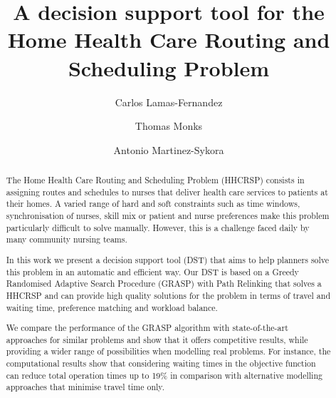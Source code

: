 \documentclass[a4paper,11pt,authoryear]{elsarticle}
\begin{document}
\begin{frontmatter}

\title{A decision support tool for the Home Health Care Routing and Scheduling Problem}

\author[1]{Carlos Lamas-Fernandez}
\address[1]{Southampton Business School, University of Southampton, Southampton SO17 1BJ, UK}

\author[2]{Thomas Monks}
\address[2]{University of Exeter Medical School, University of Exeter, Exeter, UK}
\author[1]{Antonio Martinez-Sykora}

\begin{abstract}
The Home Health Care Routing and Scheduling Problem (HHCRSP) consists in assigning routes and schedules to nurses that deliver health care services to patients at their homes. A varied range of hard and soft constraints such as time windows, synchronisation of nurses, skill mix or patient and nurse preferences make this problem particularly difficult to solve manually. However, this is a challenge faced daily by many community nursing teams.

In this work we present a decision support tool (DST) that aims to help planners solve this problem in an automatic and efficient way. Our DST is based on a Greedy Randomised Adaptive Search Procedure (GRASP) with Path Relinking that solves a HHCRSP and can provide high quality solutions for the problem in terms of travel and waiting time, preference matching and workload balance. 


We compare the performance of the GRASP algorithm with state-of-the-art approaches for similar problems and show that it offers competitive results, while providing a wider range of possibilities when modelling real problems. For instance, the computational results show that considering waiting times in the objective function can reduce total operation times up to 19\% in comparison with alternative modelling approaches that minimise travel time only.


\end{abstract}
\end{frontmatter}
\end{document}
